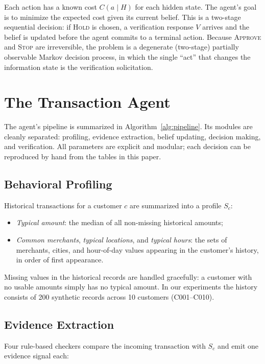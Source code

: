 \documentclass{article}
\begin{document}
Each action has a known cost $C(a \mid H)$ for each hidden state. The agent's
goal is to minimize the expected cost given its current belief. This is a
two-stage sequential decision: if \textsc{Hold} is chosen, a verification
response $V$ arrives and the belief is updated before the agent commits to a
terminal action. Because \textsc{Approve} and \textsc{Stop} are irreversible,
the problem is a degenerate (two-stage) partially observable Markov decision
process, in which the single ``act'' that changes the information state is the
verification solicitation.

\section{The Transaction Agent}

The agent's pipeline is summarized in Algorithm~\ref{alg:pipeline}. Its modules
are cleanly separated: profiling, evidence extraction, belief updating,
decision making, and verification. All parameters are explicit and modular;
each decision can be reproduced by hand from the tables in this paper.

\subsection{Behavioral Profiling}

Historical transactions for a customer $c$ are summarized into a profile
$S_c$:
\begin{itemize}
  \item \emph{Typical amount}: the median of all non-missing historical
  amounts;
  \item \emph{Common merchants}, \emph{typical locations}, and \emph{typical
  hours}: the sets of merchants, cities, and hour-of-day values appearing in
  the customer's history, in order of first appearance.
\end{itemize}

Missing values in the historical records are handled gracefully: a customer
with no usable amounts simply has no typical amount. In our experiments the
history consists of 200 synthetic records across 10 customers (C001--C010).

\subsection{Evidence Extraction}

Four rule-based checkers compare the incoming transaction with $S_c$ and emit
one evidence signal each:
\end{document}
